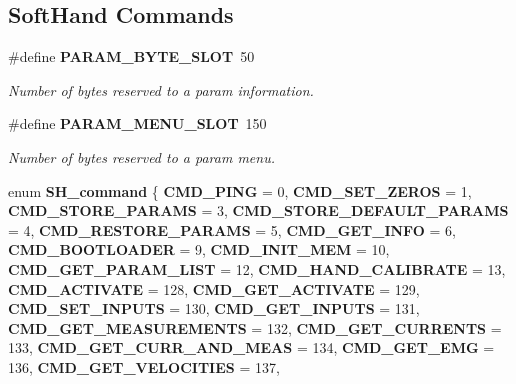 \subsection*{Soft\+Hand Commands}
\begin{DoxyCompactItemize}
\item 
\mbox{\label{commands_8h_ae3302107827a773be3200e459e7b24da}} 
\#define \textbf{ P\+A\+R\+A\+M\+\_\+\+B\+Y\+T\+E\+\_\+\+S\+L\+OT}~50
\begin{DoxyCompactList}\small\item\em Number of bytes reserved to a param information. \end{DoxyCompactList}\item 
\mbox{\label{commands_8h_a3bab5133f6aa363d84307b39e17b0d74}} 
\#define \textbf{ P\+A\+R\+A\+M\+\_\+\+M\+E\+N\+U\+\_\+\+S\+L\+OT}~150
\begin{DoxyCompactList}\small\item\em Number of bytes reserved to a param menu. \end{DoxyCompactList}\item 
enum \textbf{ S\+H\+\_\+command} \{ \newline
\textbf{ C\+M\+D\+\_\+\+P\+I\+NG} = 0, 
\textbf{ C\+M\+D\+\_\+\+S\+E\+T\+\_\+\+Z\+E\+R\+OS} = 1, 
\textbf{ C\+M\+D\+\_\+\+S\+T\+O\+R\+E\+\_\+\+P\+A\+R\+A\+MS} = 3, 
\textbf{ C\+M\+D\+\_\+\+S\+T\+O\+R\+E\+\_\+\+D\+E\+F\+A\+U\+L\+T\+\_\+\+P\+A\+R\+A\+MS} = 4, 
\newline
\textbf{ C\+M\+D\+\_\+\+R\+E\+S\+T\+O\+R\+E\+\_\+\+P\+A\+R\+A\+MS} = 5, 
\textbf{ C\+M\+D\+\_\+\+G\+E\+T\+\_\+\+I\+N\+FO} = 6, 
\textbf{ C\+M\+D\+\_\+\+B\+O\+O\+T\+L\+O\+A\+D\+ER} = 9, 
\textbf{ C\+M\+D\+\_\+\+I\+N\+I\+T\+\_\+\+M\+EM} = 10, 
\newline
\textbf{ C\+M\+D\+\_\+\+G\+E\+T\+\_\+\+P\+A\+R\+A\+M\+\_\+\+L\+I\+ST} = 12, 
\textbf{ C\+M\+D\+\_\+\+H\+A\+N\+D\+\_\+\+C\+A\+L\+I\+B\+R\+A\+TE} = 13, 
\textbf{ C\+M\+D\+\_\+\+A\+C\+T\+I\+V\+A\+TE} = 128, 
\textbf{ C\+M\+D\+\_\+\+G\+E\+T\+\_\+\+A\+C\+T\+I\+V\+A\+TE} = 129, 
\newline
\textbf{ C\+M\+D\+\_\+\+S\+E\+T\+\_\+\+I\+N\+P\+U\+TS} = 130, 
\textbf{ C\+M\+D\+\_\+\+G\+E\+T\+\_\+\+I\+N\+P\+U\+TS} = 131, 
\textbf{ C\+M\+D\+\_\+\+G\+E\+T\+\_\+\+M\+E\+A\+S\+U\+R\+E\+M\+E\+N\+TS} = 132, 
\textbf{ C\+M\+D\+\_\+\+G\+E\+T\+\_\+\+C\+U\+R\+R\+E\+N\+TS} = 133, 
\newline
\textbf{ C\+M\+D\+\_\+\+G\+E\+T\+\_\+\+C\+U\+R\+R\+\_\+\+A\+N\+D\+\_\+\+M\+E\+AS} = 134, 
\textbf{ C\+M\+D\+\_\+\+G\+E\+T\+\_\+\+E\+MG} = 136, 
\textbf{ C\+M\+D\+\_\+\+G\+E\+T\+\_\+\+V\+E\+L\+O\+C\+I\+T\+I\+ES} = 137, 

\end{DoxyCompactItemize}

